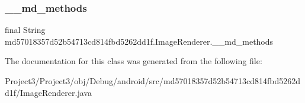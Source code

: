 \subsubsection{\texorpdfstring{\+\_\+\+\_\+md\+\_\+methods}{\_\_md\_methods}}
{\footnotesize\ttfamily final String md57018357d52b54713cd814fbd5262dd1f.\+Image\+Renderer.\+\_\+\+\_\+md\+\_\+methods\hspace{0.3cm}{\ttfamily [static]}}



The documentation for this class was generated from the following file\+:\begin{DoxyCompactItemize}
\item 
Project3/\+Project3/obj/\+Debug/android/src/md57018357d52b54713cd814fbd5262dd1f/Image\+Renderer.\+java\end{DoxyCompactItemize}
